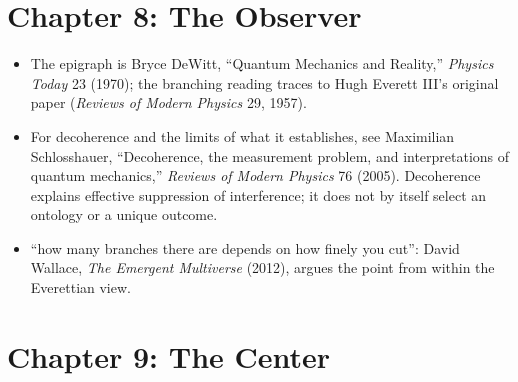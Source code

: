 \section*{Chapter 8: The Observer}

\begin{itemize}
\setlength{\itemsep}{0.5em}
\item The epigraph is Bryce DeWitt, ``Quantum Mechanics and Reality,'' \textit{Physics Today} 23 (1970); the branching reading traces to Hugh Everett III's original paper (\textit{Reviews of Modern Physics} 29, 1957).
\item For decoherence and the limits of what it establishes, see Maximilian Schlosshauer, ``Decoherence, the measurement problem, and interpretations of quantum mechanics,'' \textit{Reviews of Modern Physics} 76 (2005). Decoherence explains effective suppression of interference; it does not by itself select an ontology or a unique outcome.
\item ``how many branches there are depends on how finely you cut'': David Wallace, \textit{The Emergent Multiverse} (2012), argues the point from within the Everettian view.
\end{itemize}

\section*{Chapter 9: The Center}

